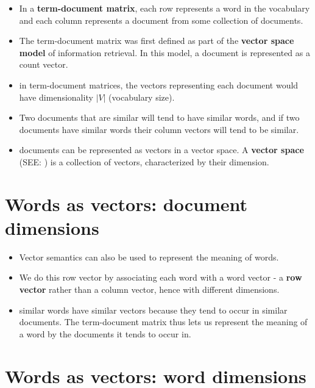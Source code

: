 \begin{itemize}
    \item In a \textbf{term-document matrix}, each row represents a word in the vocabulary and each column represents a document from some collection of documents.
    
    \item The term-document matrix was first defined as part of the \textbf{vector space model} of information retrieval. In this model, a document is represented as a count vector.

    \item in term-document matrices, the vectors representing each document would have dimensionality $|V|$ (vocabulary size).

    \item Two documents that are similar will tend to have similar words, and if two documents have similar words their column vectors will tend to be similar.

    \item documents can be represented as vectors in a vector space. A \textbf{vector space} (SEE: ) is a collection of vectors, characterized by their dimension.
\end{itemize}

\section{Words as vectors: document dimensions \cite{nlp-1}}\label{tf-idf: Words as vectors: document dimensions}

\begin{itemize}
    \item Vector semantics can also be used to represent the meaning of words. 

    \item We do this row vector by associating each word with a word vector - a \textbf{row vector} rather than a column vector, hence with different dimensions.

    \item similar words have similar vectors because they tend to occur in similar documents. The term-document matrix thus lets us represent the meaning of a word by the documents it tends to occur in.
\end{itemize}


\section{Words as vectors: word dimensions \cite{nlp-1}} \label{tf-idf: Words as vectors: word dimensions}

